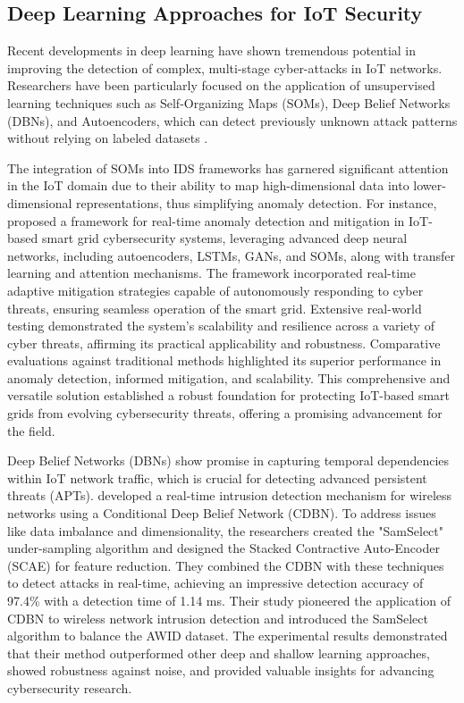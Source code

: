 \subsection{Deep Learning Approaches for IoT Security}
Recent developments in deep learning have shown tremendous potential in improving the detection of complex, multi-stage cyber-attacks in IoT networks. Researchers have been particularly focused on the application of unsupervised learning techniques such as Self-Organizing Maps (SOMs), Deep Belief Networks (DBNs), and Autoencoders, which can detect previously unknown attack patterns without relying on labeled datasets \cite{chahal2024ddos, karnani2024comprehensive}.

The integration of SOMs into IDS frameworks has garnered significant attention in the IoT domain due to their ability to map high-dimensional data into lower-dimensional representations, thus simplifying anomaly detection. For instance, \citet{quraishi2024employing} proposed a framework for real-time anomaly detection and mitigation in IoT-based smart grid cybersecurity systems, leveraging advanced deep neural networks, including autoencoders, LSTMs, GANs, and SOMs, along with transfer learning and attention mechanisms. The framework incorporated real-time adaptive mitigation strategies capable of autonomously responding to cyber threats, ensuring seamless operation of the smart grid. Extensive real-world testing demonstrated the system’s scalability and resilience across a variety of cyber threats, affirming its practical applicability and robustness. Comparative evaluations against traditional methods highlighted its superior performance in anomaly detection, informed mitigation, and scalability. This comprehensive and versatile solution established a robust foundation for protecting IoT-based smart grids from evolving cybersecurity threats, offering a promising advancement for the field.

Deep Belief Networks (DBNs) show promise in capturing temporal dependencies within IoT network traffic, which is crucial for detecting advanced persistent threats (APTs). \citet{yang2020real} developed a real-time intrusion detection mechanism for wireless networks using a Conditional Deep Belief Network (CDBN). To address issues like data imbalance and dimensionality, the researchers created the "SamSelect" under-sampling algorithm and designed the Stacked Contractive Auto-Encoder (SCAE) for feature reduction. They combined the CDBN with these techniques to detect attacks in real-time, achieving an impressive detection accuracy of 97.4\% with a detection time of 1.14 ms. Their study pioneered the application of CDBN to wireless network intrusion detection and introduced the SamSelect algorithm to balance the AWID dataset. The experimental results demonstrated that their method outperformed other deep and shallow learning approaches, showed robustness against noise, and provided valuable insights for advancing cybersecurity research.

